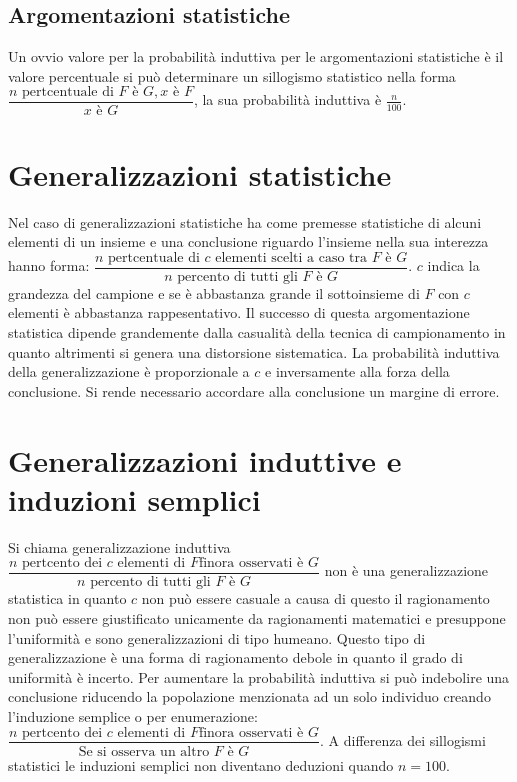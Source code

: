 \subsection{Argomentazioni statistiche}
Un ovvio valore per la probabilit\`a induttiva per le argomentazioni statistiche \`e il valore percentuale si pu\`o determinare un sillogismo statistico
nella forma $\dfrac{n\text{ pertcentuale di }F\text{ \`e }G, x \text{ \`e } F}{x \text{ \`e } G}$, la sua probabilit\`a induttiva \`e $\frac{n}{100}$. 
\section{Generalizzazioni statistiche}
Nel caso di generalizzazioni statistiche ha come premesse statistiche di alcuni elementi di un insieme e una conclusione riguardo l'insieme nella sua 
interezza hanno forma: $\dfrac{n\text{ pertcentuale di }c \text{ elementi scelti a caso tra }F\text{ \`e }G}{n \text{ percento di tutti gli }F \text{ \`e } 
G}$. $c$ indica la grandezza del campione e se \`e abbastanza grande il sottoinsieme di $F$ con $c$ elementi \`e abbastanza rappesentativo. Il successo di 
questa argomentazione statistica dipende grandemente dalla casualit\`a della tecnica di campionamento in quanto altrimenti si genera una distorsione 
sistematica. La probabilit\`a induttiva della generalizzazione \`e proporzionale a $c$ e inversamente alla forza della conclusione. Si rende necessario 
accordare alla conclusione un margine di errore. 
\section{Generalizzazioni induttive e induzioni semplici}
Si chiama generalizzazione induttiva $\dfrac{n\text{ pertcento dei }c \text{ elementi di }F\text{finora osservati \`e }G}{n \text{ percento di tutti gli }F 
\text{ \`e }  G}$ non \`e una generalizzazione statistica in quanto $c$ non pu\`o essere casuale a causa di questo il ragionamento non pu\`o essere 
giustificato unicamente da ragionamenti matematici e presuppone l'uniformit\`a e sono generalizzazioni di tipo humeano. Questo tipo di generalizzazione \`e 
una forma di ragionamento debole in quanto il grado di uniformit\`a \`e incerto. Per aumentare la probabilit\`a induttiva si pu\`o indebolire una
conclusione riducendo la popolazione menzionata ad un solo individuo creando l'induzione semplice o per enumerazione:  $\dfrac{n\text{ pertcento dei }c 
\text{ elementi di }F\text{finora osservati \`e }G}{\text{Se si osserva un altro }F \text{ \`e }  G}$. A differenza dei sillogismi statistici le induzioni
semplici non diventano deduzioni quando $n=100$. 
